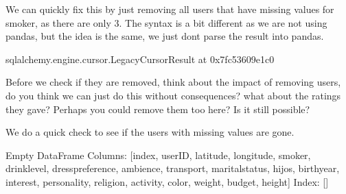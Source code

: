 \documentclass[letterpaper,10pt,english]{jupyterBook}
\begin{document}
\sphinxAtStartPar
We can quickly fix this by just removing all users that have missing values for smoker, as there are only 3.
The syntax is a bit different as we are not using pandas, but the idea is the same, we just dont parse the result into pandas.

\begin{sphinxVerbatim}[commandchars=\\\{\}]
  
\end{sphinxVerbatim}

\begin{sphinxVerbatim}[commandchars=\\\{\}]
\PYGZlt{}sqlalchemy.engine.cursor.LegacyCursorResult at 0x7fc53609e1c0\PYGZgt{}
\end{sphinxVerbatim}

\sphinxAtStartPar
Before we check if they are removed, think about the impact of removing users, do you think we can just do this without consequences? what about the ratings they gave? Perhaps you could remove them too here? Is it still possible?

\sphinxAtStartPar
We do a quick check to see if the users with missing values are gone.

\begin{sphinxVerbatim}[commandchars=\\\{\}]
  
\end{sphinxVerbatim}

\begin{sphinxVerbatim}[commandchars=\\\{\}]
Empty DataFrame
Columns: [index, userID, latitude, longitude, smoker, drink\PYGZus{}level, dress\PYGZus{}preference, ambience, transport, marital\PYGZus{}status, hijos, birth\PYGZus{}year, interest, personality, religion, activity, color, weight, budget, height]
Index: []
\end{sphinxVerbatim}
\end{document}
